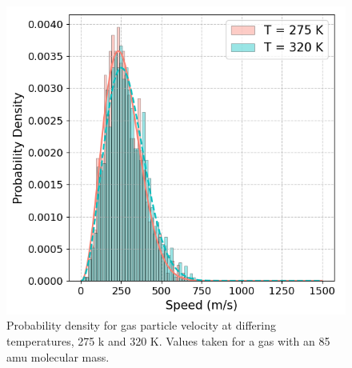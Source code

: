 \documentclass[%
 reprint,
 amsmath,amssymb,
 aps,
]{revtex4-2}
\begin{document}
\begin{figure}[H]
	\caption{Probability density for gas particle velocity at differing temperatures, 275 k and 320 K. Values taken for a gas with an 85 amu molecular mass. }	
	\centering
	\includegraphics[scale=0.5]{appendix2.png}
\end{figure}

\nocite{*}

\end{document}
